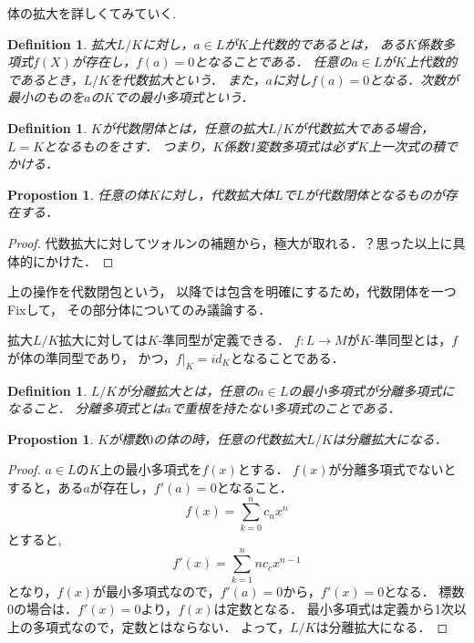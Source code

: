 \documentclass{ujarticle}
\newtheorem{dfn}[thm]{Definition}
\newtheorem{prop}[thm]{Propostion}
\begin{document}
体の拡大を詳しくてみていく.
\begin{dfn}
拡大$L/K$に対し，$a \in L$が$K$上代数的であるとは，
ある$K$係数多項式$f(X)$が存在し，$f(a)=0$となることである．
任意の$a \in L$が$K$上代数的であるとき，$L/K$を代数拡大という．
また，$a$に対し$f(a)=0$となる．次数が最小のものを$a$の$K$での最小多項式という．
\end{dfn}


\begin{dfn}
 $K$が代数閉体とは，任意の拡大$L/K$が代数拡大である場合，$L=K$となるものをさす．
 つまり，$K$係数1変数多項式は必ず$K$上一次式の積でかける．
\end{dfn}

\begin{prop}
 任意の体$K$に対し，代数拡大体$L$で$L$が代数閉体となるものが存在する．
\end{prop}
\begin{proof}
代数拡大に対してツォルンの補題から，極大が取れる．？思った以上に具体的にかけた．
\end{proof}

上の操作を代数閉包という，
以降では包含を明確にするため，代数閉体を一つFixして，
その部分体についてのみ議論する．

拡大$L/K$拡大に対しては$K$-準同型が定義できる．
$f:L \to M$が$K$-準同型とは，$f$が体の準同型であり，
かつ，$f|_{K}=id_K$となることである．

\begin{dfn}
 $L/K$が分離拡大とは，任意の$a \in L$の最小多項式が分離多項式になること．
 分離多項式とは$a$で重根を持たない多項式のことである．
\end{dfn}

\begin{prop}
 $K$が標数$0$の体の時，任意の代数拡大$L/K$は分離拡大になる．
\end{prop}
\begin{proof}
  $a \in L$の$K$上の最小多項式を$f(x)$とする．
  $f(x)$が分離多項式でないとすると，ある$a$が存在し，$f'(a)=0$となること．
  \begin{equation*}
   f(x)=\sum_{k=0}^n c_nx^n
  \end{equation*}
  とすると,
  \begin{equation*}
   f'(x)=\sum_{k=1}^n nc_cx^{n-1}
  \end{equation*}
  となり，$f(x)$が最小多項式なので，$f'(a)=0$から，$f'(x)=0$となる．
  標数$0$の場合は．$f'(x)=0$より，$f(x)$は定数となる．
  最小多項式は定義から1次以上の多項式なので，定数とはならない．
  よって，$L/K$は分離拡大になる．
\end{proof}
\end{document}

